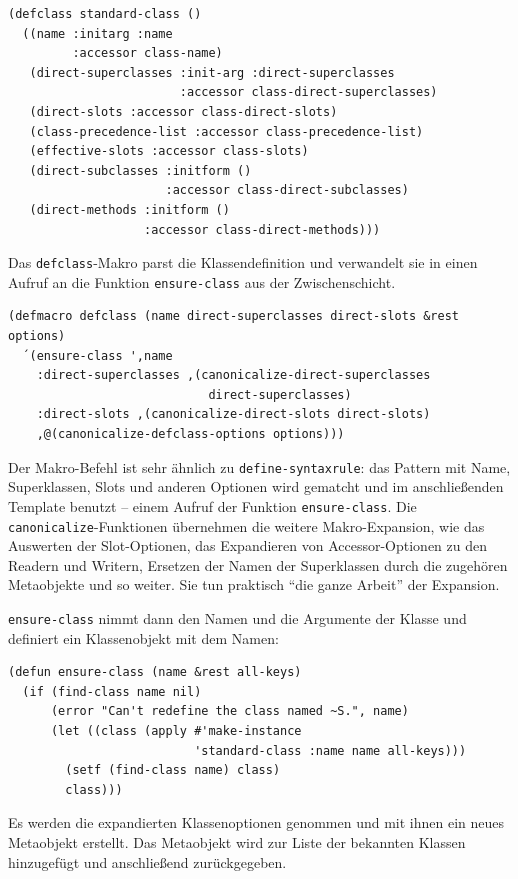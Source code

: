 \begin{lstlisting}
(defclass standard-class ()
  ((name :initarg :name
         :accessor class-name)
   (direct-superclasses :init-arg :direct-superclasses
                        :accessor class-direct-superclasses)
   (direct-slots :accessor class-direct-slots)
   (class-precedence-list :accessor class-precedence-list)
   (effective-slots :accessor class-slots)
   (direct-subclasses :initform ()
                      :accessor class-direct-subclasses)
   (direct-methods :initform ()
                   :accessor class-direct-methods)))
\end{lstlisting}

Das \texttt{defclass}-Makro parst die Klassendefinition und verwandelt sie in einen Aufruf an die Funktion \texttt{ensure-class} aus der Zwischenschicht. 

\begin{lstlisting}
(defmacro defclass (name direct-superclasses direct-slots &rest options)
  ´(ensure-class ',name
    :direct-superclasses ,(canonicalize-direct-superclasses 
                            direct-superclasses)
    :direct-slots ,(canonicalize-direct-slots direct-slots)
    ,@(canonicalize-defclass-options options)))
\end{lstlisting}

Der Makro-Befehl ist sehr ähnlich zu \texttt{define-syntaxrule}: das Pattern mit Name, Superklassen, Slots und anderen Optionen wird gematcht und im anschließenden Template benutzt -- einem Aufruf der Funktion \texttt{ensure-class}. Die \texttt{canonicalize}-Funktionen übernehmen die weitere Makro-Expansion, wie das Auswerten der Slot-Optionen, das Expandieren von Accessor-Optionen zu den Readern und Writern, Ersetzen der Namen der Superklassen durch die zugehören Metaobjekte und so weiter. Sie tun praktisch ``die ganze Arbeit'' der Expansion.

\texttt{ensure-class} nimmt dann den Namen und die Argumente der Klasse und definiert ein Klassenobjekt mit dem Namen:

\begin{lstlisting}
(defun ensure-class (name &rest all-keys)
  (if (find-class name nil)
      (error "Can't redefine the class named ~S.", name)
      (let ((class (apply #'make-instance
                          'standard-class :name name all-keys)))
        (setf (find-class name) class)
        class)))
\end{lstlisting}

Es werden die expandierten Klassenoptionen genommen und mit ihnen ein neues Metaobjekt erstellt. Das Metaobjekt wird zur Liste der bekannten Klassen hinzugefügt und anschließend zurückgegeben. 

